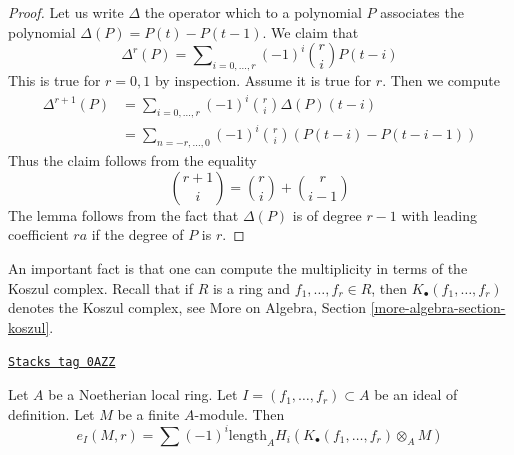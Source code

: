 \begin{proof}
Let us write $\Delta$ the operator which to a polynomial $P$ associates
the polynomial $\Delta(P) = P(t) - P(t - 1)$. We claim that
$$
\Delta^r(P) = \sum\nolimits_{i = 0, \ldots, r} (-1)^i {r \choose i} P(t - i)
$$
This is true for $r = 0, 1$ by inspection. Assume it is true for $r$.
Then we compute
\begin{align*}
\Delta^{r + 1}(P)
& =
\sum\nolimits_{i = 0, \ldots, r} (-1)^i {r \choose i} \Delta(P)(t - i) \\
& =
\sum\nolimits_{n = -r, \ldots, 0} (-1)^i {r \choose i}
(P(t - i) - P(t - i - 1))
\end{align*}
Thus the claim follows from the equality
$$
{r + 1 \choose i} = {r \choose i} + {r \choose i - 1}
$$
The lemma follows from the fact that $\Delta(P)$ is of degree $r - 1$
with leading coefficient $ra$ if the degree of $P$ is $r$.
\end{proof}

An important fact is that one can compute the multiplicity in terms
of the Koszul complex. Recall that if $R$ is a ring and
$f_1, \ldots, f_r \in R$, then $K_\bullet(f_1, \ldots, f_r)$
denotes the Koszul complex, see
More on Algebra, Section \ref{more-algebra-section-koszul}.

\begin{theorem}
\label{intersection-theorem-multiplicity-with-koszul}
\href{https://stacks.math.columbia.edu/tag/0AZZ}{\texttt{Stacks tag 0AZZ}}

\begin{reference}
\cite[Theorem 1 in part B of Chapter IV]{Serre_algebre_locale}
\end{reference}
Let $A$ be a Noetherian local ring. Let $I = (f_1, \ldots, f_r) \subset A$
be an ideal of definition. Let $M$ be a finite $A$-module. Then
$$
e_I(M, r) = \sum
(-1)^i\text{length}_A H_i(K_\bullet(f_1, \ldots, f_r) \otimes_A M)
$$
\end{theorem}

